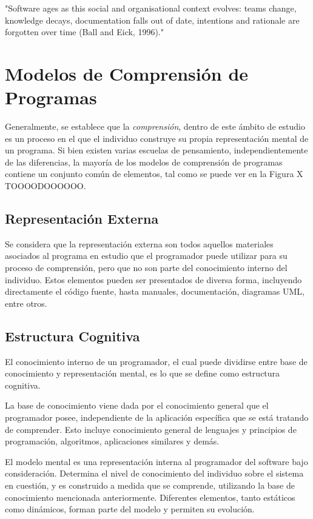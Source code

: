 "Software ages as this social and organisational context evolves: teams change,
knowledge decays, documentation falls out of date, intentions and rationale are forgotten over time
(Ball and Eick, 1996)."

\section{Modelos de Comprensión de Programas}
Generalmente, se establece que la \textit{comprensión}, dentro de este ámbito de estudio es un
proceso en el que el individuo construye su propia representación mental de un programa.
Si bien existen varias escuelas de pensamiento, independientemente de las diferencias, la
mayoría de los modelos de comprensión de programas contiene un conjunto común de elementos,
tal como se puede ver en la Figura X TOOOODOOOOOO.

\subsection{Representación Externa}
Se considera que la representación externa son todos aquellos materiales asociados al programa
en estudio que el programador puede utilizar para su proceso de comprensión, pero que no son 
parte del conocimiento interno del individuo.
Estos elementos pueden ser presentados de diversa forma, incluyendo directamente el código fuente,
hasta manuales, documentación, diagramas UML, entre otros.

\subsection{Estructura Cognitiva}
El conocimiento interno de un programador, el cual puede dividirse entre base de conocimiento
y representación mental, es lo que se define como estructura cognitiva.

La base de conocimiento viene dada por el conocimiento general que el programador posee,
independiente de la aplicación específica que se está tratando de comprender.
Esto incluye conocimiento general de lenguajes y principios de programación, algoritmos, 
aplicaciones similares y demás.

El modelo mental es una representación interna al programador del software bajo consideración.
Determina el nivel de conocimiento del individuo sobre el sistema en cuestión, y es construido
a medida que se comprende, utilizando la base de conocimiento mencionada anteriormente.
Diferentes elementos, tanto estáticos como dinámicos, forman parte del modelo y permiten
su evolución.\cite{MayrhauserVans95}

